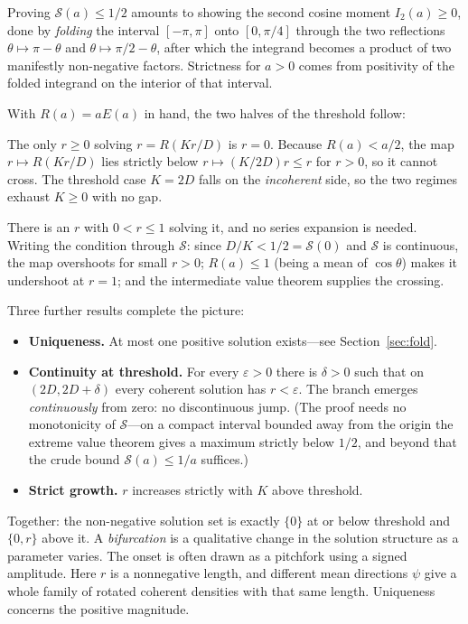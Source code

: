 \documentclass[11pt]{article}
\begin{document}
Proving $\mathcal{S}(a)\le1/2$ amounts to showing the second cosine moment
$I_2(a)\ge0$, done by \emph{folding} the interval $[-\pi,\pi]$ onto
$[0,\pi/4]$ through the two reflections $\theta\mapsto\pi-\theta$ and
$\theta\mapsto\pi/2-\theta$, after which the integrand becomes a product of two
manifestly non-negative factors. Strictness for $a>0$ comes from positivity of
the folded integrand on the interior of that interval.

With $R(a)=aE(a)$ in hand, the two halves of the threshold follow:

\begin{description}[leftmargin=*,style=nextline]
\item[Subcritical ($K\le2D$).] The only $r\ge0$ solving $r=R(Kr/D)$ is $r=0$.
Because $R(a)<a/2$, the map $r\mapsto R(Kr/D)$ lies strictly below
$r\mapsto (K/2D)r \le r$ for $r>0$, so it cannot cross. The threshold case
$K=2D$ falls on the \emph{incoherent} side, so the two regimes exhaust
$K\ge0$ with no gap.
\item[Supercritical ($K>2D$).] There is an $r$ with $0<r\le1$ solving it, and
no series expansion is needed. Writing the condition through $\mathcal{S}$: since
$D/K<1/2=\mathcal{S}(0)$ and $\mathcal{S}$ is continuous, the map overshoots for small $r>0$;
$R(a)\le1$ (being a mean of $\cos\theta$) makes it undershoot at $r=1$; and the
intermediate value theorem supplies the crossing.
\end{description}

\noindent
Three further results complete the picture:
\begin{itemize}[leftmargin=*,noitemsep]
\item \textbf{Uniqueness.} At most one positive solution exists---see
Section~\ref{sec:fold}.
\item \textbf{Continuity at threshold.} For every $\varepsilon>0$ there is
$\delta>0$ such that on $(2D,2D+\delta)$ every coherent solution has
$r<\varepsilon$. The branch emerges \emph{continuously} from zero: no
discontinuous jump. (The proof needs no monotonicity of $\mathcal{S}$---on a compact
interval bounded away from the origin the extreme value theorem gives a
maximum strictly below $1/2$, and beyond that the crude bound $\mathcal{S}(a)\le1/a$
suffices.)
\item \textbf{Strict growth.} $r$ increases strictly with $K$ above threshold.
\end{itemize}

\noindent
Together: the non-negative solution set is exactly $\{0\}$ at or below
threshold and $\{0,r\}$ above it. A \emph{bifurcation} is a qualitative change
in the solution structure as a parameter varies. The onset is often drawn as
a pitchfork using a signed amplitude. Here $r$ is a nonnegative length, and
different mean directions $\psi$ give a whole family of rotated coherent
densities with that same length. Uniqueness concerns the positive magnitude.
\end{document}
